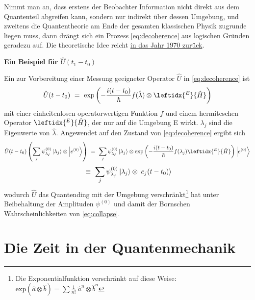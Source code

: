 \documentclass[12pt]{article}
\begin{document}
Nimmt man an, dass erstens der Beobachter Information nicht direkt aus dem Quantenteil abgreifen kann, sondern nur indirekt über dessen Umgebung, und zweitens die Quantentheorie am Ende der gesamten klassischen Physik zugrunde liegen muss, dann drängt sich ein Prozess \eqref{eq:decoherence} aus logischen Gründen geradezu auf. Die theoretische Idee reicht \href{https://de.wikipedia.org/wiki/Dieter_Zeh}{in das Jahr 1970 zurück}.
 
\textbf{Ein Beispiel für $\hat{U}(t_1-t_0)$}

Ein zur Vorbereitung einer Messung geeigneter Operator $\hat{U}$ in \eqref{eq:decoherence} ist
\begin{equation}
\label{eq:decoherence_measurement}
\hat{U}(t-t_0)\ =\ \mathrm{exp}\left(-\frac{i(t-t_0)}{\hbar}f(\hat{\lambda})\otimes \leftidx{^E}{\hat{H}}\right)
\end{equation}
mit einer einheitenlosen operatorwertigen Funktion $f$ und einem hermiteschen Operator $\leftidx{^E}{\hat{H}}$, der nur auf die Umgebung E wirkt. $\lambda_j$ sind die Eigenwerte von $\hat{\lambda}$.
Angewendet auf den Zustand von \eqref{eq:decoherence} ergibt sich
\begin{equation*}
\hat{U}(t-t_0)\left(\sum_j \psi^{(0)}_{\lambda_j} \ket{\lambda_j}\otimes\ket{e^{(0)}}\right)
\ =\ \sum_j \psi^{(0)}_{\lambda_j} \ket{\lambda_j} 
\otimes \mathrm{exp}\left(-\frac{i(t-t_0)}{\hbar}f(\lambda_j)\leftidx{^E}{\hat{H}}\right)
\ket{e^{(0)}} 
\end{equation*}
\begin{equation}
\label{eq:entangled_environment}
\ \equiv\ 
\sum_j \psi^{(0)}_{\lambda_j} \ket{\lambda_j} 
\otimes \ket{e_j(t-t_0)} 
\end{equation}
wodurch $\hat{U}$ das Quantending mit der Umgebung verschränkt\footnote{Die Exponentialfunktion verschränkt auf diese Weise: $\mathrm{exp}(\hat{a}\otimes\hat{b})=\sum \frac{1}{n\mathrm{!}}\ \hat{a}^n\otimes\hat{b}^n$} hat unter Beibehaltung der Amplituden $\psi^{(0)}$ und damit der Bornschen Wahrscheinlichkeiten von \eqref{eq:collapse}.

\section{Die Zeit in der Quantenmechanik}
\end{document}
